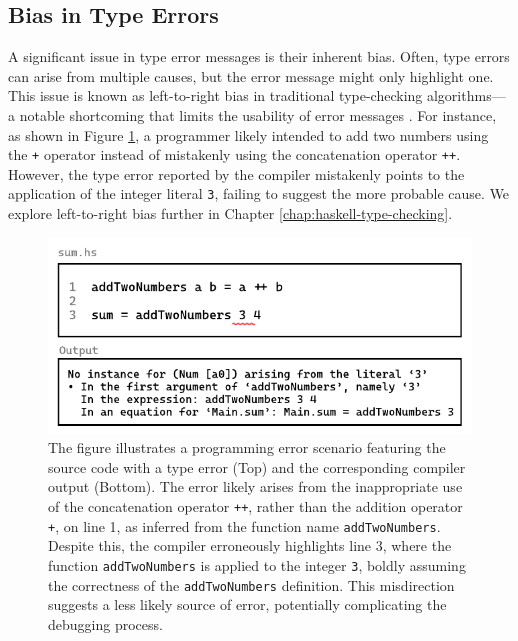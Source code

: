  \subsection{Bias in Type Errors} 
 \label{subsec:bias}
 
A significant issue in type error messages is their inherent bias. Often, type errors can arise from multiple causes, but the error message might only highlight one. This issue is known as left-to-right bias in traditional type-checking algorithms—a notable shortcoming that limits the usability of error messages \cite{McAdam2002-vb, Lee1998-fx, Chen2014-ev}.  For instance, as shown in Figure \ref{fig:type-error-example}, a programmer likely intended to add two numbers using the \texttt{+} operator instead of mistakenly using the concatenation operator \texttt{++}. However, the type error reported by the compiler mistakenly points to the application of the integer literal \texttt{3}, failing to suggest the more probable cause. We explore left-to-right bias further in Chapter \ref{chap:haskell-type-checking}.

 \begin{figure}[htbp]
  \centering
  \includegraphics[width=\linewidth]{TypeErrorExample}
  \caption[Illustrating a programming error in Haskell, featuring a function named \texttt{addTwoNumbers} with a type error and the corresponding compiler output]{
    \label{fig:type-error-example}
    The figure illustrates a programming error scenario featuring the source code with a type error (Top) and the corresponding compiler output (Bottom). The error likely arises from the inappropriate use of the concatenation operator \texttt{++}, rather than the addition operator \texttt{+}, on line 1, as inferred from the function name \texttt{addTwoNumbers}. Despite this, the compiler erroneously highlights line 3, where the function \texttt{addTwoNumbers} is applied to the integer \texttt{3}, boldly assuming the correctness of the \texttt{addTwoNumbers} definition. This misdirection suggests a less likely source of error, potentially complicating the debugging process.
    }
\end{figure}


